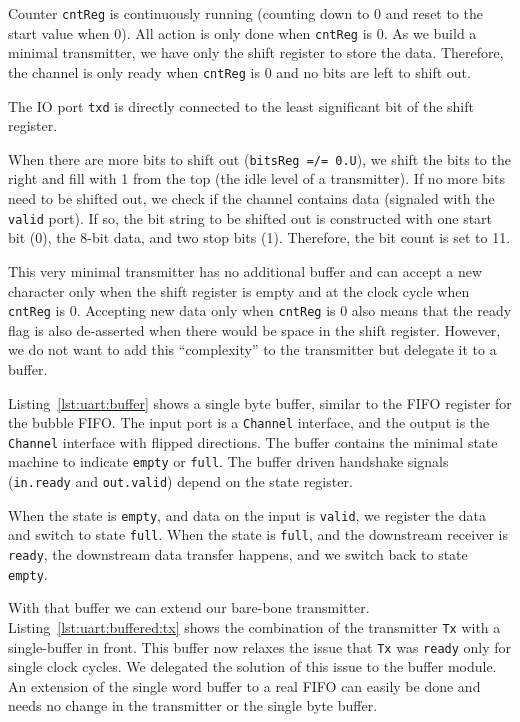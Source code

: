 \documentclass[%
    10pt,
    headinclude, footexclude,
    openright, %
    notitlepage,
    cleardoubleempty,
    headsepline,
    pointlessnumbers,
    bibtotoc, idxtotoc,
    ]{scrbook}
\newcommand{\code}[1]{{\small{\texttt{#1}}}}
\begin{document}
Counter \code{cntReg} is continuously running (counting down to 0
and reset to the start value when 0). All action is only done when
\code{cntReg} is 0. As we build a minimal transmitter, we have only
the shift register to store the data. Therefore, the channel is only ready
when \code{cntReg} is 0 and no bits are left to shift out.

The IO port \code{txd} is directly connected to the least significant bit
of the shift register.

When there are more bits to shift out (\code{bitsReg =/= 0.U}),
we shift the bits to the right and fill with 1 from the top (the idle level
of a transmitter).
If no more bits need to be shifted out, we check if the channel contains
data (signaled with the \code{valid} port). If so, the bit string to
be shifted out is constructed with one start bit (0), the 8-bit data, and
two stop bits (1). Therefore, the bit count is set to 11.

This very minimal transmitter has no additional buffer and can
accept a new character only when the shift register is empty
and at the clock cycle when \code{cntReg} is 0.
Accepting new data only when \code{cntReg} is 0 also means
that the ready flag is also de-asserted when there would be
space in the shift register. However, we do not want to add this
``complexity'' to the transmitter but delegate it to a buffer.

Listing~\ref{lst:uart:buffer} shows a single byte buffer, similar to
the FIFO register for the bubble FIFO. The input port is a \code{Channel}
interface, and the output is the \code{Channel} interface with
flipped directions. The buffer contains the minimal state machine
to indicate \code{empty} or \code{full}. The buffer driven handshake
signals (\code{in.ready} and \code{out.valid}) depend on the state
register.

When the state is \code{empty}, and data on the input is \code{valid},
we register the data and switch to state \code{full}.
When the state is \code{full}, and the downstream receiver is
\code{ready}, the downstream data transfer happens, and we switch
back to state \code{empty}.

With that buffer we can extend our bare-bone transmitter.
Listing~\ref{lst:uart:buffered:tx} shows the combination of the transmitter \code{Tx}
with a single-buffer in front. This buffer now relaxes the issue that \code{Tx}
was \code{ready} only for single clock cycles. We delegated the solution of
this issue to the buffer module.
An extension of the single word buffer to a real FIFO can easily be done
and needs no change in the transmitter or the single byte buffer.
\end{document}
